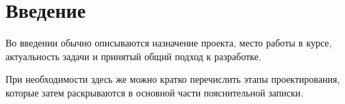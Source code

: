 \section*{Введение}

Во введении обычно описываются назначение проекта, место работы в курсе,
актуальность задачи и принятый общий подход к разработке.

При необходимости здесь же можно кратко перечислить этапы проектирования,
которые затем раскрываются в основной части пояснительной записки.
